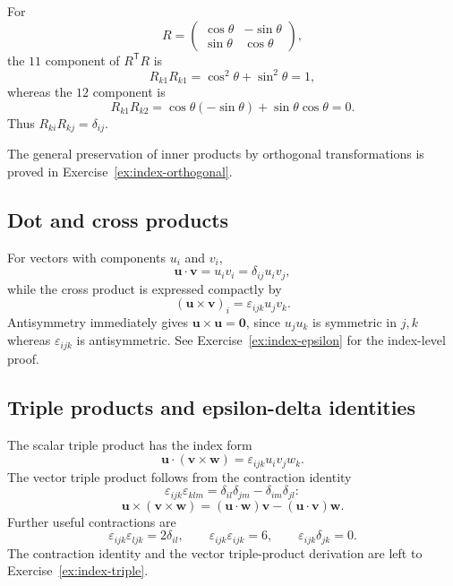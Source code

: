 \begin{example}
For
\begin{equation}
R=\begin{pmatrix}\cos\theta&-\sin\theta\\ \sin\theta&\cos\theta\end{pmatrix},
\end{equation}
the $11$ component of $R^{\mathsf T}R$ is
\begin{equation}
R_{k1}R_{k1}=\cos^2\theta+\sin^2\theta=1,
\end{equation}
whereas the $12$ component is
\begin{equation}
R_{k1}R_{k2}=\cos\theta(-\sin\theta)+\sin\theta\cos\theta=0.
\end{equation}
Thus $R_{ki}R_{kj}=\delta_{ij}$.
\end{example}
The general preservation of inner products by orthogonal transformations is proved in Exercise~\ref{ex:index-orthogonal}.

\subsection{Dot and cross products}
For vectors with components $u_i$ and $v_i$,
\begin{equation}
\mathbf{u}\cdot\mathbf{v}=u_iv_i=\delta_{ij}u_iv_j,
\end{equation}
while the cross product is expressed compactly by
\begin{equation}
(\mathbf{u}\times\mathbf{v})_i=\varepsilon_{ijk}u_jv_k.
\end{equation}
Antisymmetry immediately gives $\mathbf{u}\times\mathbf{u}=\mathbf{0}$, since $u_ju_k$ is symmetric in $j,k$ whereas $\varepsilon_{ijk}$ is antisymmetric.
See Exercise~\ref{ex:index-epsilon} for the index-level proof.

\subsection{Triple products and epsilon-delta identities}
The scalar triple product has the index form
\begin{equation}
\mathbf{u}\cdot(\mathbf{v}\times\mathbf{w})=\varepsilon_{ijk}u_iv_jw_k.
\end{equation}
The vector triple product follows from the contraction identity
\begin{equation}
\varepsilon_{ijk}\varepsilon_{klm}=\delta_{il}\delta_{jm}-\delta_{im}\delta_{jl}:
\end{equation}
\begin{equation}
\mathbf{u}\times(\mathbf{v}\times\mathbf{w})
=(\mathbf{u}\cdot\mathbf{w})\mathbf{v}-(\mathbf{u}\cdot\mathbf{v})\mathbf{w}.
\end{equation}
Further useful contractions are
\begin{equation}
\varepsilon_{ijk}\varepsilon_{ljk}=2\delta_{il},
\qquad
\varepsilon_{ijk}\varepsilon_{ijk}=6,
\qquad
\varepsilon_{ijk}\delta_{jk}=0.
\end{equation}
The contraction identity and the vector triple-product derivation are left to Exercise~\ref{ex:index-triple}.

